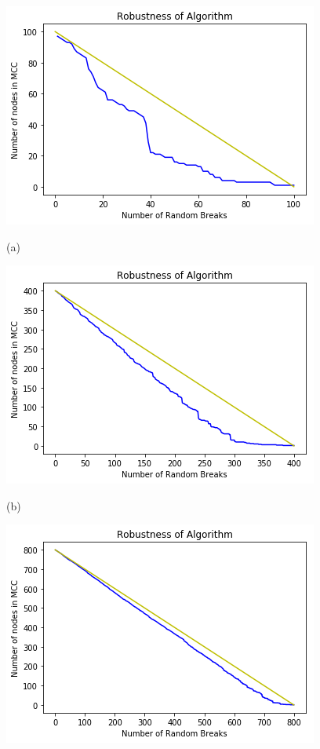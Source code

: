 \documentclass{article}
\begin{document}
\begin{figure}[!htb]
	\includegraphics[width=\linewidth]{Results/100-1(G).png}
	\begin{center}
		(a)
	\end{center}
	\endminipage\hfill
	\includegraphics[width=\linewidth]{Results/400-1(G).png}
	\begin{center}
		(b)
	\end{center}
	\endminipage\hfill
	\includegraphics[width=\linewidth]{Results/800-1(G).png}

\end{figure}
\end{document}
